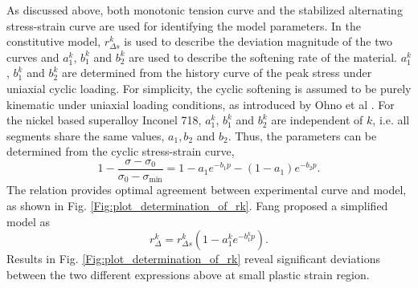 
As discussed above, both monotonic tension curve and the stabilized alternating stress-strain curve are used for identifying the model parameters.
In the constitutive model, $r_{\Delta s}^k$ is used to describe the deviation magnitude of the two curves and $a_{1}^k$, $b_{1}^k$ and $b_{2}^k$ are used to describe the softening rate of the material.
$a_{1}^k$, $b_{1}^k$ and $b_{2}^k$ are determined from the history curve of the peak stress under uniaxial cyclic loading. For simplicity, the cyclic softening is assumed to be purely kinematic under uniaxial loading conditions, as introduced by Ohno et al \cite{Ohno1993375}.
For the nickel based superalloy Inconel 718, $a_{1}^k$, $b_{1}^k$ and $b_{2}^k$ are independent of $k$, i.e. all segments share the same values, $a_1, b_2$ and $b_2$.
Thus, the parameters can be determined from the cyclic stress-strain curve,
\begin{equation}
1 - \frac{{\sigma  - {\sigma _0}}}{{{\sigma _0} - {\sigma _{\min }}}} = 1 - a_1{e^{ - b_1 p}} - \left( {1 - a_1} \right){e^{ - b_2 p}}.
\end{equation}
The relation provides optimal agreement between experimental curve and model, as shown in Fig. \ref{Fig:plot_determination_of_rk}. Fang \cite{fang2015cyclic} proposed a simplified model as
\begin{equation}
r_\Delta ^k = r_{\Delta s}^k\left( 1 - a_1^k{e^{ - b_1^kp}}\right).
\label{Equ:fangrdeltak}
\end{equation}
Results in Fig. \ref{Fig:plot_determination_of_rk} reveal significant deviations between the two different expressions above at small plastic strain region.

